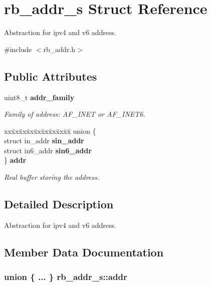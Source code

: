 \section{rb\+\_\+addr\+\_\+s Struct Reference}
\label{structrb__addr__s}


Abstraction for ipv4 and v6 address.  




{\ttfamily \#include $<$rb\+\_\+addr.\+h$>$}

\subsection*{Public Attributes}
\begin{DoxyCompactItemize}
\item 
uint8\+\_\+t {\bf addr\+\_\+family}
\begin{DoxyCompactList}\small\item\em Family of address\+: A\+F\+\_\+\+I\+N\+E\+T or A\+F\+\_\+\+I\+N\+E\+T6. \end{DoxyCompactList}\item 
\begin{tabbing}
xx\=xx\=xx\=xx\=xx\=xx\=xx\=xx\=xx\=\kill
union \{\\
\>struct in\_addr {\bf sin\_addr}\\
\>struct in6\_addr {\bf sin6\_addr}\\
\} {\bf addr}\\

\end{tabbing}\begin{DoxyCompactList}\small\item\em Real buffer storing the address. \end{DoxyCompactList}\end{DoxyCompactItemize}


\subsection{Detailed Description}
Abstraction for ipv4 and v6 address. 

\subsection{Member Data Documentation}
\subsubsection[{addr}]{\setlength{\rightskip}{0pt plus 5cm}union \{ ... \}  rb\+\_\+addr\+\_\+s\+::addr}\label{structrb__addr__s_ab669e4f43ac662476dd7e1824f28f422}


